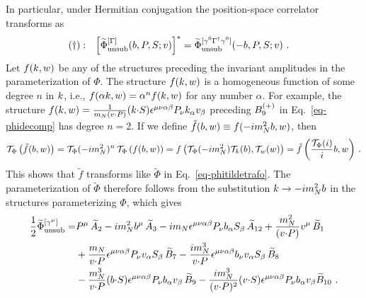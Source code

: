 In particular, under Hermitian conjugation the position-space correlator transforms as
\begin{align}
	&(\dagger): &\left[ \widetilde{\Phi}^{[\Gamma]}_{\text{unsub}}(b,P,S;v)  \right]^* &= \widetilde{\Phi}^{[\gamma^0 \Gamma^\dagger \gamma^0]}_{\text{unsub}}(-b,P,S;v)  \ .\label{eq-conhermtilde}
\end{align}
Let $f(k,w)$ be any of the structures preceding the invariant amplitudes in the parameterization of $\Phi$.
The structure $f(k,w)$ is a homogeneous function of some degree $n$ in $k$, i.e., $f(\alpha k,w) = \alpha^n f(k,w)$ for any number $\alpha$. 
For example, the structure $f(k,w) = \frac{1}{m_N (v {\cdot} P)} (k {\cdot} S) \epsilon^{\mu \nu \alpha \beta} P_\nu k_\alpha v_\beta$ preceding $B^{(+)}_9$ in Eq.\ \eqref{eq-phidecomp} has degree $n=2$.
If we define $\tilde f(b,w) \equiv f(- i m_N^2 b,w)$, then 
\begin{align}
	\mathcal{T}_\Phi\left( \tilde f(b, w) \right) =
	\mathcal{T}_\Phi(-i m_N^2)^n\, \mathcal{T}_\Phi\left( f( b, w) \right) =
	f\left( \mathcal{T}_\Phi(-i m_N^2) \mathcal{T}_k(b) , \mathcal{T}_w(w) \right) =
	\tilde f \left(  \frac{\mathcal{T}_\Phi(i)}{i} b, w \right)\, .
	\end{align}
This shows that $\tilde f$ transforms like $\widetilde \Phi$ in Eq.\ \eqref{eq-phitildetrafo}.
The parameterization of $\widetilde{\Phi}$ therefore follows from the substitution $k \rightarrow -i m_N^2 b$ in the structures parameterizing $\Phi$, which gives
\begin{align}  \frac{1}{2}\widetilde \Phi^{[\gamma^\mu]}_{\text{unsub}}  = & P^\mu\, \widetilde{A}_2 - i m_N^2 b^\mu\, \widetilde{A}_3 - i m_N \epsilon^{\mu \nu \alpha \beta} P_\nu b_\alpha S_\beta\, \widetilde{A}_{12} + \frac{m_N^2}{(v {\cdot} P)} v^\mu\, \widetilde{B}_1\nonumber\\
& + \frac{m_N}{v {\cdot} P} \epsilon^{\mu \nu \alpha \beta} P_\nu v_\alpha S_\beta\, \widetilde{B}_7  - \frac{ i m_N^3}{v {\cdot} P} \epsilon^{\mu \nu \alpha \beta} b_\nu v_\alpha S_\beta\, \widetilde{B}_8 \nonumber\\
& - \frac{m_N^3}{v {\cdot} P} (b {\cdot} S) \epsilon^{\mu \nu \alpha \beta} P_\nu b_\alpha v_\beta\, \widetilde{B}_9  - \frac{i m_N^3}{(v {\cdot} P)^2} (v {\cdot} S) \epsilon^{\mu \nu \alpha \beta} P_\nu b_\alpha v_\beta \widetilde{B}_{10}\ . 
\label{eq-phitildedecomp}
\end{align}

